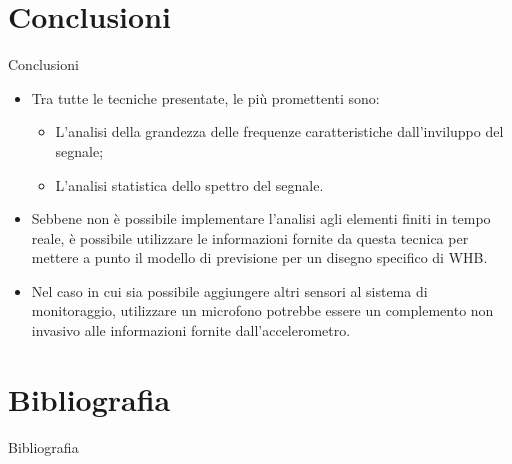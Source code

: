 \documentclass{beamer}
\begin{document}
\section{Conclusioni}

\begin{frame}{Conclusioni}
    \begin{itemize}
        \item Tra tutte le tecniche presentate, le più promettenti sono:
        \begin{itemize}
            \item L'analisi della grandezza delle frequenze caratteristiche dall'inviluppo del segnale;
            \item L'analisi statistica dello spettro del segnale.
        \end{itemize}
        \item Sebbene non è possibile implementare l'analisi agli elementi finiti in tempo reale, è possibile utilizzare le informazioni fornite da questa tecnica per mettere a punto il modello di previsione per un disegno specifico di WHB.
        \item Nel caso in cui sia possibile aggiungere altri sensori al sistema di monitoraggio, utilizzare un microfono potrebbe essere un complemento non invasivo alle informazioni fornite dall'accelerometro.
    \end{itemize}
\end{frame}

\section*{Bibliografia}

\begin{frame}[allowframebreaks]{Bibliografia}
    \printbibliography
\end{frame}
\end{document}

